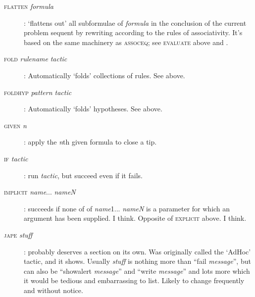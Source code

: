 \begin{description}
\item [\textsc{flatten} \textit{formula}]: `flattens out' all subformulae of \textit{formula} in the conclusion of the current problem sequent by rewriting according to the rules of associativity. It's based on the same machinery as \textsc{assoceq}; see \textsc{evaluate} above and .


\item [\textsc{fold} \textit{rulename} \textit{tactic}]: Automatically `folds' collections of rules. See  above.
\item [\textsc{foldhyp} \textit{pattern tactic}]: Automatically `folds' hypotheses. See  above.

\item [\textsc{given} \textit{n}]: apply the \textit{n}th given formula to close a tip.

\item [\textsc{if} \textit{tactic}]: run \textit{tactic}, but succeed even if it fails.


\item [\textsc{implicit} \textit{name}... \textit{nameN}]: succeeds if none of of \textit{name}1... \textit{nameN} is a parameter for which an argument has been supplied. I think. Opposite of \textsc{explicit} above. I think.


\item [\textsc{jape} \textit{stuff} ]: probably deserves a section on its own. Was originally called the `AdHoc' tactic, and it shows. Usually \textit{stuff} is nothing more than ``fail \textit{message}'', but can also be ``showalert \textit{message}'' and ``write \textit{message}'' and lots more which it would be tedious and embarrassing to list. Likely to change frequently and without notice.



\end{description}
